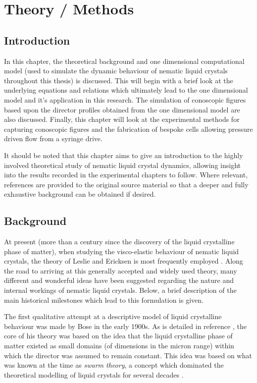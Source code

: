 \section{Theory / Methods}
\label{sec:theory}
\subsection{Introduction}
In this chapter, the theoretical background and one dimensional computational model (used to simulate the dynamic behaviour of nematic liquid crystals throughout this thesis) is discussed. This will begin with a brief look at the underlying equations and relations which ultimately lead to the one dimensional model and it's application in this research. The simulation of conoscopic figures based upon the director profiles obtained from the one dimensional model are also discussed. Finally, this chapter will look at the experimental methods for capturing conoscopic figures and the fabrication of bespoke cells allowing pressure driven flow from a syringe drive.

It should be noted that this chapter aims to give an introduction to the highly involved theoretical study of nematic liquid crystal dynamics, allowing insight into the results recorded in the experimental chapters to follow. Where relevant, references are provided to the original source material so that a deeper and fully exhaustive background can be obtained if desired.

\subsection{Background}
At present (more than a century since the discovery of the liquid crystalline phase of matter), when studying the visco-elastic behaviour of nematic liquid crystals, the theory of Leslie and Ericksen is most frequently employed \cite{Taylor1999}. Along the road to arriving at this generally accepted and widely used theory, many different and wonderful ideas have been suggested regarding the nature and internal workings of nematic liquid crystals. Below, a brief description of the main historical milestones which lead to this formulation is given.

The first qualitative attempt at a descriptive model of liquid crystalline behaviour was made by Bose in the early 1900s. As is detailed in reference \cite{Taylor1999}, the core of his theory was based on the idea that the liquid crystalline phase of matter existed as small domains (of dimensions in the micron range) within which the director was assumed to remain constant. This idea was based on what was known at the time as \textit{swarm theory}, a concept which dominated the theoretical modelling of liquid crystals for several decades \cite{Taylor1999}.

